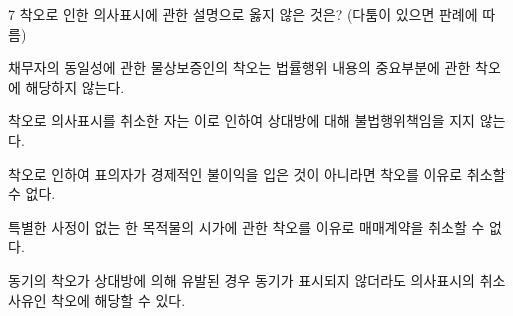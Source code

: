 \begin{question}{7}
착오로 인한 의사표시에 관한 설명으로 옳지 않은 것은? (다툼이 있으면 판례에 따름)
\begin{choices}
  \item 채무자의 동일성에 관한 물상보증인의 착오는 법률행위 내용의 중요부분에 관한 착오에 해당하지 않는다.
  \item 착오로 의사표시를 취소한 자는 이로 인하여 상대방에 대해 불법행위책임을 지지 않는다.
  \item 착오로 인하여 표의자가 경제적인 불이익을 입은 것이 아니라면 착오를 이유로 취소할 수 없다.
  \item 특별한 사정이 없는 한 목적물의 시가에 관한 착오를 이유로 매매계약을 취소할 수 없다.
  \item 동기의 착오가 상대방에 의해 유발된 경우 동기가 표시되지 않더라도 의사표시의 취소 사유인 착오에 해당할 수 있다.
\end{choices}
\end{question}
